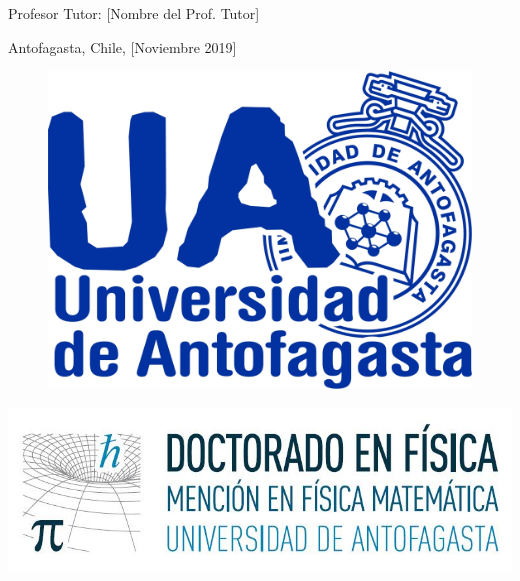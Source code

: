 \documentclass[lettersize,12pt]{report}
\begin{document}
\vspace*{15mm}
\begin{large}
	Profesor Tutor: 
	\hspace{15mm} 
	[Nombre del Prof. Tutor] 

\vspace*{60mm}
\begin{center}
	Antofagasta, Chile, [Noviembre 2019]
\end{center}
\end{large}

\newpage
\thispagestyle{empty}

\begin{figure}
	\includegraphics[scale=.22]{./logouajpg.jpg}
 \end{figure}

\vspace*{-32mm}
\begin{flushright}
	\includegraphics[scale=.27]{./logodoctorado.jpg}
\end{flushright}
\end{document}
